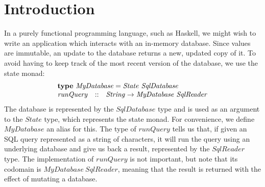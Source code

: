 \section{Introduction}
\label{sec:introduction}

In a purely functional programming language, such as Haskell, we might wish to write an application which interacts with an in-memory database. Since values are immutable, an update to the database returns a new, updated copy of it. To avoid having to keep track of the most recent version of the database, we use the state monad:
\begin{displaymath}
\begin{array}{lcl}
\multicolumn{3}{l}{\mathbf{type}~\mathit{MyDatabase} = \mathit{State}~\mathit{SqlDatabase}}\\
\mathit{runQuery} & :: & \mathit{String} \to \mathit{MyDatabase}~\mathit{SqlReader}
\end{array}
\end{displaymath}
The database is represented by the $\mathit{SqlDatabase}$ type and is used as an argument to the $\mathit{State}$ type, which represents the state monad. For convenience, we define $\mathit{MyDatabase}$ an alias for this. The type of $\mathit{runQuery}$ tells us that, if given an SQL query represented as a string of characters, it will run the query using an underlying database and give us back a result, represented by the $\mathit{SqlReader}$ type.
The implementation of $\mathit{runQuery}$ is not important, but note that its codomain is $\mathit{MyDatabase}~\mathit{SqlReader}$, meaning that the result is returned with the effect of mutating a database. 

